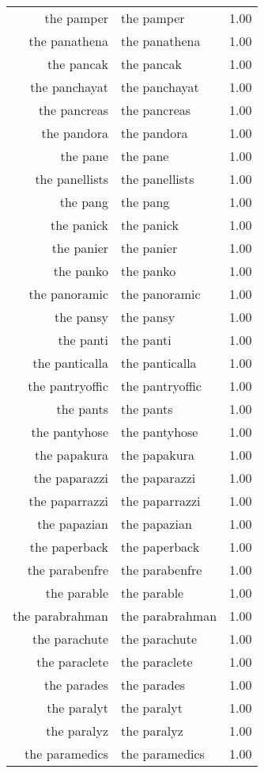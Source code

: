 \begin{table}[ht]
\begin{tabular}{rlr}
  the pamper & the pamper & 1.00 \\ 
  the panathena & the panathena & 1.00 \\ 
  the pancak & the pancak & 1.00 \\ 
  the panchayat & the panchayat & 1.00 \\ 
  the pancreas & the pancreas & 1.00 \\ 
  the pandora & the pandora & 1.00 \\ 
  the pane & the pane & 1.00 \\ 
  the panellists & the panellists & 1.00 \\ 
  the pang & the pang & 1.00 \\ 
  the panick & the panick & 1.00 \\ 
  the panier & the panier & 1.00 \\ 
  the panko & the panko & 1.00 \\ 
  the panoramic & the panoramic & 1.00 \\ 
  the pansy & the pansy & 1.00 \\ 
  the panti & the panti & 1.00 \\ 
  the panticalla & the panticalla & 1.00 \\ 
  the pantryoffic & the pantryoffic & 1.00 \\ 
  the pants & the pants & 1.00 \\ 
  the pantyhose & the pantyhose & 1.00 \\ 
  the papakura & the papakura & 1.00 \\ 
  the paparazzi & the paparazzi & 1.00 \\ 
  the paparrazzi & the paparrazzi & 1.00 \\ 
  the papazian & the papazian & 1.00 \\ 
  the paperback & the paperback & 1.00 \\ 
  the parabenfre & the parabenfre & 1.00 \\ 
  the parable & the parable & 1.00 \\ 
  the parabrahman & the parabrahman & 1.00 \\ 
  the parachute & the parachute & 1.00 \\ 
  the paraclete & the paraclete & 1.00 \\ 
  the parades & the parades & 1.00 \\ 
  the paralyt & the paralyt & 1.00 \\ 
  the paralyz & the paralyz & 1.00 \\ 
  the paramedics & the paramedics & 1.00 \\ 

\end{tabular}
\end{table}
